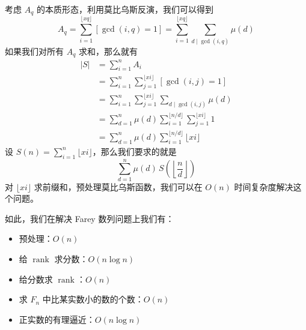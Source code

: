 考虑 $A_q$ 的本质形态，利用莫比乌斯反演，我们可以得到
\[
A_q = \sum_{i=1}^{\lfloor x q \rfloor} [\gcd(i,q)=1] = \sum_{i=1}^{\lfloor x q \rfloor} \sum_{d\mid \gcd(i,q)} \mu(d)
\]
如果我们对所有 $A_q$ 求和，那么就有
\[
\begin{aligned}
|S| &= \sum_{i=1}^{n} A_i \\
    &= \sum_{i=1}^{n} \sum_{j=1}^{\lfloor x i \rfloor} [\gcd(i,j)=1] \\
    &= \sum_{i=1}^{n} \sum_{j=1}^{\lfloor x i \rfloor} \sum_{d\mid \gcd(i,j)} \mu(d) \\
    &= \sum_{d=1}^{n} \mu(d) \sum_{i=1}^{\lfloor n/d \rfloor} \sum_{j=1}^{\lfloor x i \rfloor} 1 \\
    &= \sum_{d=1}^{n} \mu(d) \sum_{i=1}^{\lfloor n/d \rfloor} \lfloor x i \rfloor
\end{aligned}
\]
设 $S(n) = \sum_{i=1}^{n} \lfloor x i \rfloor$，那么我们要求的就是
\[
\sum_{d=1}^{n} \mu(d)\, S\!\left(\left\lfloor\frac{n}{d}\right\rfloor\right)
\]
对 $\lfloor x i \rfloor$ 求前缀和，预处理莫比乌斯函数，我们可以在 $O(n)$ 时间复杂度解决这个问题。

如此，我们在解决 Farey 数列问题上我们有：
\begin{itemize}
    \item 预处理：$O(n)$
    \item 给 $\operatorname{rank}$ 求分数：$O(n\log n)$
    \item 给分数求 $\operatorname{rank}$：$O(n)$
    \item 求 $F_n$ 中比某实数小的数的个数：$O(n)$
    \item 正实数的有理逼近：$O(n\log n)$
\end{itemize}